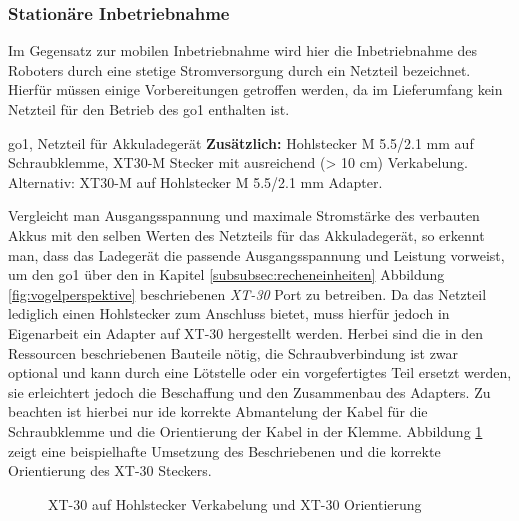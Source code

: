 \subsubsection{Stationäre Inbetriebnahme}
\label{subsubsec:inbetriebnahme_netzteil}

Im Gegensatz zur mobilen Inbetriebnahme wird hier die Inbetriebnahme des Roboters durch eine stetige Stromversorgung durch ein Netzteil
bezeichnet.
Hierfür müssen einige Vorbereitungen getroffen werden, da im Lieferumfang kein Netzteil für den Betrieb des \gls{go1}
enthalten ist.

\begin{requirements}
    \gls{go1}, Netzteil für Akkuladegerät\newline
    \textbf{Zusätzlich:} Hohlstecker M \num{5,5}/\num{2,1} mm auf Schraubklemme, XT30-M Stecker mit ausreichend (> \num{10} cm)
    Verkabelung.
    Alternativ: XT30-M auf Hohlstecker M \num{5,5}/\num{2,1} mm Adapter.
\end{requirements}

Vergleicht man Ausgangsspannung und maximale Stromstärke des verbauten Akkus mit den selben Werten des Netzteils für das
Akkuladegerät, so erkennt man, dass das Ladegerät die passende Ausgangsspannung und Leistung vorweist, um den \gls{go1}
über den in Kapitel \ref{subsubsec:recheneinheiten} Abbildung \ref{fig:vogelperspektive} beschriebenen \emph{XT-30} Port
zu betreiben.
Da das Netzteil lediglich einen Hohlstecker zum Anschluss bietet, muss hierfür jedoch in Eigenarbeit ein Adapter auf XT-30
hergestellt werden.
Herbei sind die in den Ressourcen beschriebenen Bauteile nötig, die Schraubverbindung ist zwar optional und kann durch eine
Lötstelle oder ein vorgefertigtes Teil ersetzt werden, sie erleichtert jedoch die Beschaffung und den Zusammenbau des Adapters.
Zu beachten ist hierbei nur ide korrekte Abmantelung der Kabel für die Schraubklemme und die Orientierung der Kabel in der
Klemme.
Abbildung \ref{fig:xt30} zeigt eine beispielhafte Umsetzung des Beschriebenen und die korrekte Orientierung des XT-30 Steckers.

\begin{figure}[h]
    \caption{XT-30 auf Hohlstecker Verkabelung und XT-30 Orientierung}\label{fig:xt30}
\end{figure}

